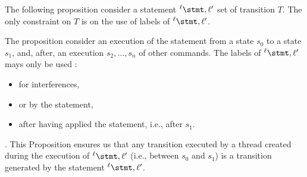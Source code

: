 \documentclass[12pt]{article}
\newcommand{\lab}{  {}^{\ell}}
\newcounter{labels}[figure]
\begin{document}
The following proposition consider a statement \(\lab\stmt,\ell'\) set of transition \(T\). The only constraint on \(T\) is on the use of labels of \(\lab\stmt,\ell'\). 

The proposition consider an execution of the statement from a state \(s_0\) to a state \(s_1\), and, after, an execution \(s_2,\ldots,s_n\) of other commands.
The labels of \(\lab\stmt,\ell'\) mays only be used :
\begin{itemize}
 \item for interferences,
 \item or by the statement,
 \item after having applied the statement, i.e., after \(s_1\).
\end{itemize}.
This Proposition ensures us that any transition executed by a thread created during the execution of \(\lab\stmt,\ell'\) (i.e., between \(s_0\) and \(s_1\)) is a transition generated by the statement \(\lab\stmt,\ell'\).
\end{document}
